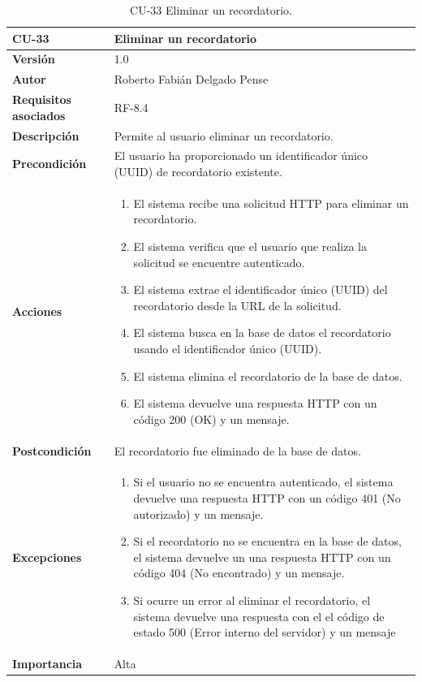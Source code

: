 \begin{table}[p]
	\centering
	\begin{tabularx}{\linewidth}{ p{} p{} }
		\toprule
		\textbf{CU-33}    & \textbf{Eliminar un recordatorio}\\
		\toprule
		\textbf{Versión}              & 1.0    \\
		\textbf{Autor}                & Roberto Fabián Delgado Pense \\
		\textbf{Requisitos asociados} & RF-8.4 \\ 
		\textbf{Descripción}          & Permite al usuario eliminar un recordatorio. \\
		\textbf{Precondición}         & El usuario ha proporcionado un identificador único (UUID) de recordatorio existente.\\
		\textbf{Acciones}             &
		\begin{enumerate}
			\def\labelenumi{\arabic{enumi}.}
			\tightlist
			\item El sistema recibe una solicitud HTTP para eliminar un recordatorio.
                   \item El sistema verifica que el usuario que realiza la solicitud se encuentre autenticado.
			\item El sistema extrae el identificador único (UUID) del recordatorio desde la URL de la solicitud.
                \item El sistema busca en la base de datos el recordatorio usando el identificador único (UUID).
                \item El sistema elimina el recordatorio de la base de datos.
                \item El sistema devuelve una respuesta HTTP con un código 200 (OK) y un mensaje.
            \end{enumerate}\\
		\textbf{Postcondición}        & El recordatorio fue eliminado de la base de datos.\\
		\textbf{Excepciones}          & 
            \begin{enumerate}
			\def\labelenumi{\arabic{enumi}.}
			\tightlist
   			\item Si el usuario no se encuentra autenticado, el sistema devuelve           una respuesta HTTP con un código 401 (No autorizado) y un mensaje.
                \item   Si el recordatorio no se encuentra en la base de datos, el sistema devuelve un                           una respuesta HTTP con un código 404 (No encontrado) y un mensaje. 
                \item Si ocurre un error al eliminar el recordatorio, el sistema devuelve una respuesta con el el código de estado 500 (Error interno del servidor) y un mensaje
            \end{enumerate}\\
		\textbf{Importancia}          & Alta \\
		\bottomrule
	\end{tabularx}
	\caption{CU-33 Eliminar un recordatorio.}
\end{table}

